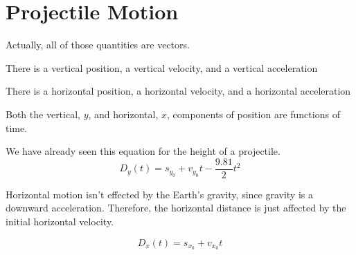 \documentclass{ximera}
\begin{document}
\section{Projectile Motion}


Actually, all of those quantities are vectors.  

\begin{observation}
\item There is a vertical position, a vertical velocity, and a vertical acceleration
\item There is a horizontal position, a horizontal velocity, and a horizontal acceleration
\end{observation}



Both the vertical, $y$, and horizontal, $x$, components of position are functions of time.

We have already seen this equation for the height of a projectile.
\[ D_y(t) = s_{y_0} + v_{y_0} t - \frac{9.81}{2} t^2  \]

Horizontal motion isn't effected by the Earth's gravity, since gravity is a downward acceleration. Therefore, the horizontal distance is just affected by the initial horizontal velocity.


\[ D_x(t) = s_{x_0} + v_{x_0} t  \]
\end{document}
